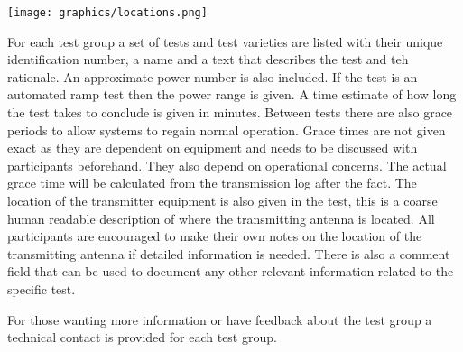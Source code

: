 \documentclass[a4paper]{book}
\begin{document}
\texttt{[image: graphics/locations.png]}

For each test group a set of tests and test varieties are listed with their unique identification number, a name and a text that describes the test and teh rationale. An approximate power number is also included. If the test is an automated ramp test then the power range is given. A time estimate of how long the test takes to conclude is given in minutes. Between tests there are also grace periods to allow systems to regain normal operation. Grace  times are not given exact as they are dependent on equipment and needs to be discussed with participants beforehand. They also depend on operational concerns. The actual grace time will be calculated from the transmission log after the fact. The location of the transmitter equipment is also given in the test, this is a coarse human readable description of where the transmitting antenna is located. All participants are encouraged to make their own notes on the location of the transmitting antenna if detailed information is needed. There is also a comment field that can be used to document any other relevant information related to the specific test. \newline

For those wanting more information or have feedback about the test group a technical contact is provided for each test group. 


%
\end{document}
